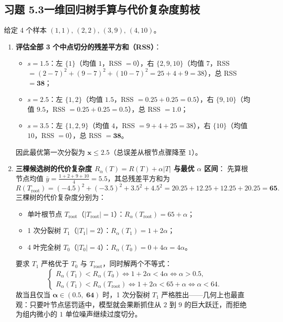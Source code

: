\subsection*{习题 5.3\quad 一维回归树手算与代价复杂度剪枝}
给定 4 个样本 $(1, 1),\, (2, 2),\, (3, 9),\, (4, 10)$。
\begin{enumerate}[label=(\arabic*), leftmargin=1.8em]
  \item \textbf{评估全部 3 个中点切分的残差平方和（RSS）}：
  \begin{itemize}
    \item $s = 1.5$：左 $\{1\}$（均值 $1$，RSS $= 0$），右 $\{2, 9, 10\}$（均值 $7$，RSS $= (2-7)^2 + (9-7)^2 + (10-7)^2 = 25 + 4 + 9 = 38$），总 RSS $= \mathbf{38}$；
    \item $s = 2.5$：左 $\{1, 2\}$（均值 $1.5$，RSS $= 0.25 + 0.25 = 0.5$），右 $\{9, 10\}$（均值 $9.5$，RSS $= 0.25 + 0.25 = 0.5$），总 RSS $= \mathbf{1.0}$；
    \item $s = 3.5$：左 $\{1, 2, 9\}$（均值 $4$，RSS $= 9 + 4 + 25 = 38$），右 $\{10\}$（均值 $10$，RSS $= 0$），总 RSS $= \mathbf{38}$。
  \end{itemize}
  因此最优第一次分裂为 $\mathbf{x \le 2.5}$（总误差从根节点骤降至 $1$）。

  \item \textbf{三棵候选树的代价复杂度 $R_\alpha(T) = R(T) + \alpha|T|$ 与最优 $\alpha$ 区间}：
  先算根节点均值 $\bar{y} = \frac{1+2+9+10}{4} = 5.5$，其总残差平方和为
  \[
    R(T_{\mathrm{root}}) = (-4.5)^2 + (-3.5)^2 + 3.5^2 + 4.5^2 = 20.25 + 12.25 + 12.25 + 20.25 = \mathbf{65}.
  \]
  三棵树的代价复杂度分别为：
  \begin{itemize}
    \item 单叶根节点 $T_{\mathrm{root}}$（$|T_{\mathrm{root}}| = 1$）：$R_\alpha(T_{\mathrm{root}}) = 65 + \alpha$；
    \item 1 次分裂树 $T_1$（$|T_1| = 2$）：$R_\alpha(T_1) = 1 + 2\alpha$；
    \item 4 叶完全树 $T_0$（$|T_0| = 4$）：$R_\alpha(T_0) = 0 + 4\alpha = 4\alpha$。
  \end{itemize}
  要求 $T_1$ 严格优于 $T_0$ 与 $T_{\mathrm{root}}$，同时解两个不等式：
  \[
    \begin{cases}
      R_\alpha(T_1) < R_\alpha(T_0) \iff 1 + 2\alpha < 4\alpha \iff \alpha > 0.5, \\
      R_\alpha(T_1) < R_\alpha(T_{\mathrm{root}}) \iff 1 + 2\alpha < 65 + \alpha \iff \alpha < 64.
    \end{cases}
  \]
  故当且仅当 $\mathbf{\alpha \in (0.5,\; 64)}$ 时，1 次分裂树 $T_1$ 严格胜出——几何上也最直观：只要叶节点惩罚适中，模型就会果断抓住从 $2$ 到 $9$ 的巨大跃迁，而拒绝为组内微小的 $1$ 单位噪声继续过度切分。
\end{enumerate}

